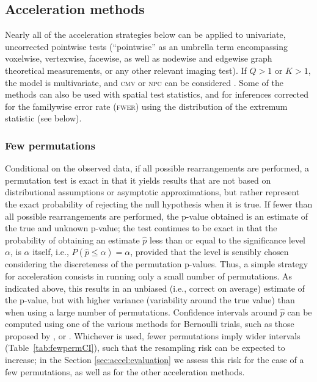 \subsection{Acceleration methods}

Nearly all of the acceleration strategies below can be applied to univariate, uncorrected pointwise tests (``pointwise'' as an umbrella term encompassing voxelwise, vertexwise, facewise, as well as nodewise and edgewise graph theoretical measurements, or any other relevant imaging test). If $Q>1$ or $K>1$, the model is multivariate, and \textsc{cmv} or \textsc{npc} can be considered \citep{Winkler2016_npc}. Some of the methods can also be used with spatial test statistics, and for inferences corrected for the familywise error rate (\textsc{fwer}) using the distribution of the extremum statistic (see below).

\subsubsection{Few permutations}
\label{sec:accel:fewperms}

Conditional on the observed data, if all possible rearrangements are performed, a permutation test is exact in that it yields results that are not based on distributional assumptions or asymptotic approximations, but rather represent the exact probability of rejecting the null hypothesis when it is true. If fewer than all possible rearrangements are performed, the p-value obtained is an estimate of the true and unknown p-value; the test continues to be exact in that the probability of obtaining an estimate $\hat{p}$ less than or equal to the significance level $\alpha$, is $\alpha$ itself, i.e., $P(\hat{p}\leqslant\alpha)=\alpha$, provided that the level is sensibly chosen considering the discreteness of the permutation p-values. Thus, a simple strategy for acceleration consists in running only a small number of permutations. As indicated above, this results in an unbiased (i.e., correct on average) estimate of the p-value, but with higher variance (variability around the true value) than when using a large number of permutations. Confidence intervals around $\hat{p}$ can be computed using one of the various methods for Bernoulli trials, such as those proposed by \citet{Wilson1927}, \citet{Clopper1934} or \citet{Agresti1998} \citep[for a comparative review, see][]{Brown2001}. Whichever is used, fewer permutations imply wider intervals (Table~\ref{tab:fewpermCI}), such that the resampling risk can be expected to increase; in the Section \ref{sec:accel:evaluation} we assess this risk for the case of a few permutations, as well as for the other acceleration methods.

